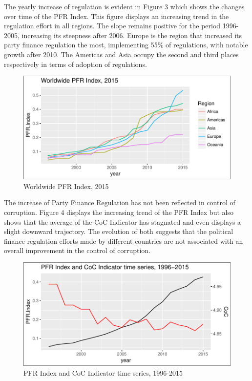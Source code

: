 \documentclass[12,twoside]{article}
\begin{document}
The yearly increase of regulation is evident in Figure 3 which shows the
changes over time of the PFR Index. This figure displays an increasing
trend in the regulation effort in all regions. The slope remains
positive for the period 1996-2005, increasing its steepness after 2006.
Europe is the region that increased its party finance regulation the
most, implementing 55\% of regulations, with notable growth after 2010.
The Americas and Asia occupy the second and third places respectively in
terms of adoption of regulations. \pagebreak

\begin{figure}[h]

{\centering \includegraphics{thesis_body_files/figure-latex/figure_iii-1} 

}

\caption{Worldwide PFR Index, 2015}\label{fig:figure_iii}
\end{figure}

The increase of Party Finance Regulation has not been reflected in
control of corruption. Figure 4 displays the increasing trend of the PFR
Index but also shows that the average of the CoC Indicator has stagnated
and even displays a slight downward trajectory. The evolution of both
suggests that the political finance regulation efforts made by different
countries are not associated with an overall improvement in the control
of corruption. \pagebreak

\begin{figure}[h]

{\centering \includegraphics{thesis_body_files/figure-latex/figure_iv-1} 

}

\caption{PFR Index and CoC Indicator time series, 1996-2015}\label{fig:figure_iv}
\end{figure}
\end{document}
